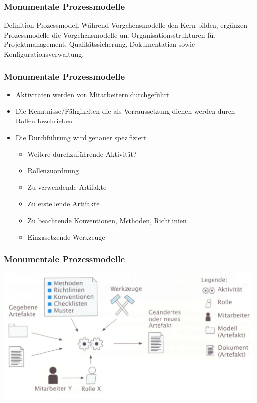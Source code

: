\begin{frame}
\frametitle{Monumentale Prozessmodelle}
	\begin{block}{Definition Prozessmodell}
		Während Vorgehensmodelle den Kern bilden, ergänzen Prozessmodelle die Vorgehensmodelle um 
		Organisationsstrukturen für Projektmanagement, Qualitätssicherung, Dokumentation sowie 
		Konfigurationsverwaltung.
	\end{block}
\end{frame}

\begin{frame}
\frametitle{Monumentale Prozessmodelle}
	\begin{itemize}
		\item Aktivitäten werden von Mitarbeitern durchgeführt
		\item Die Kenntnisse/Fähgikeiten die als Vorraussetzung dienen
		werden durch Rollen beschrieben
		\item Die Durchführung wird genauer spezifiziert
		\begin{itemize}
			\item Weitere durchzuführende Aktivität?
			\item Rollenzuordnung
			\item Zu verwendende Artifakte
			\item Zu erstellende Artifakte
			\item Zu beachtende Konventionen, Methoden, Richtlinien
			\item Einzusetzende Werkzeuge
		\end{itemize}
	\end{itemize}
\end{frame}

\begin{frame}
\frametitle{Monumentale Prozessmodelle}
	\center\includegraphics[width=1\textwidth,
			keepaspectratio=true]{bilder/prozessmodell.png}
\end{frame}

